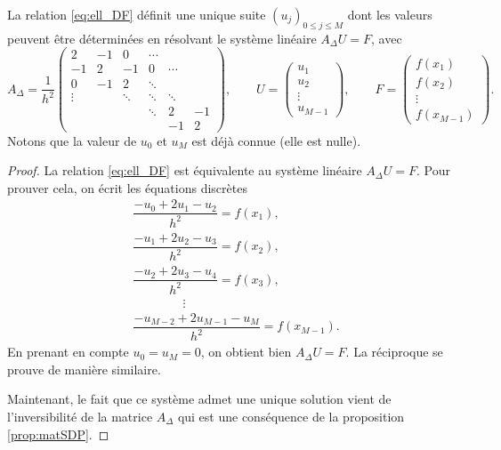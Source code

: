 \documentclass[12pt,a4paper,twoside]{article}
\begin{document}
\begin{proposition}
  La relation \eqref{eq:ell_DF} d\'efinit une unique suite $(u_j)_{0\leq j \leq M}$ dont les valeurs
  peuvent \^etre d\'etermin\'ees en r\'esolvant le syst\`eme lin\'eaire
  $A_{\Delta} U = F$, avec 
  \begin{equation}
    \label{eq:mat_DF_Laplacien}
    A_{\Delta} = \dfrac{1}{h^2} 
    \begin{pmatrix} 
      2 & -1 & 0 & \cdots
      \\
      -1 & 2 & -1 & 0 & \cdots
      \\
      0 & -1 & 2 & \ddots &
      \\
      \vdots & & \ddots & \ddots & \ddots
      \\
      & & &  \ddots & 2 & -1
      \\
      & &  & & -1 & 2
    \end{pmatrix} , \qquad U = 
    \begin{pmatrix}
      u_1 \\ u_2 \\ \vdots \\ u_{M-1}
    \end{pmatrix} , \qquad F = 
    \begin{pmatrix}
      f(x_1) \\ f(x_2) \\ \vdots \\ f(x_{M-1})
    \end{pmatrix} .
  \end{equation}
  Notons que la valeur de $u_0$ et $u_M$ est d\'ej\`a connue (elle est nulle).
\end{proposition}

\begin{proof}
  La relation \eqref{eq:ell_DF} est \'equivalente au syst\`eme lin\'eaire $A_{\Delta} U = F$.
  Pour prouver cela, on \'ecrit les \'equations discr\`etes
  \begin{align*}
    &\dfrac{-u_0 + 2 u_1 - u_2}{h^2} = f(x_1) ,
    \\
    &\dfrac{-u_1 + 2 u_2 - u_3}{h^2} = f(x_2) ,
    \\
    &\dfrac{-u_2 + 2 u_3 - u_4}{h^2} = f(x_3) ,
    \\
    & \qquad \qquad \vdots
    \\
    &\dfrac{-u_{M-2} + 2 u_{M-1} - u_M}{h^2} = f(x_{M-1}) .
  \end{align*}
  En prenant en compte $u_0 = u_M = 0$, on obtient bien $A_{\Delta} U = F$.
  La r\'eciproque se prouve de mani\`ere similaire.

  Maintenant, le fait que ce syst\`eme admet une unique solution vient de l'inversibilit\'e
  de la matrice $A_{\Delta}$ qui est une cons\'equence de la proposition \ref{prop:matSDP}.
\end{proof}
\end{document}
